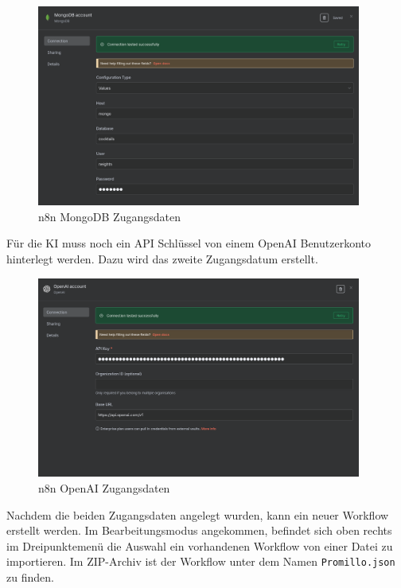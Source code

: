 \begin{figure}
    \begin{center}
        \includegraphics[width=0.95\textwidth]{images/n8n_mongo_creds.png}
    \end{center}
    \caption{n8n MongoDB Zugangsdaten}\label{fig:n8n_mongo_creds}
\end{figure}

Für die KI muss noch ein API Schlüssel von einem OpenAI Benutzerkonto hinterlegt werden. Dazu wird
das zweite Zugangsdatum erstellt.

\begin{figure}
    \begin{center}
        \includegraphics[width=0.95\textwidth]{images/n8n_openai_creds.png}
    \end{center}
    \caption{n8n OpenAI Zugangsdaten}\label{fig:n8n_openai_creds}
\end{figure}

Nachdem die beiden Zugangsdaten angelegt wurden, kann ein neuer Workflow erstellt werden. Im
Bearbeitungsmodus angekommen, befindet sich oben rechts im Dreipunktemenü die Auswahl ein
vorhandenen Workflow von einer Datei zu importieren. Im ZIP-Archiv ist der Workflow unter dem Namen
\verb|Promillo.json| zu finden.

